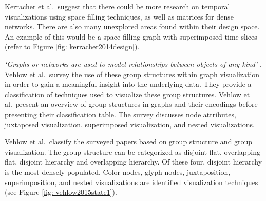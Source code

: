 %
Kerracher et al.\ suggest that there could be more research on temporal visualizations using space filling techniques, as well as matrices for dense networks. There are also many unexplored areas found within their design space. An example of this would be a space-filling graph with superimposed time-slices (refer to Figure \ref{fig: kerracher2014design}).

\textit{`Graphs or networks are used to model relationships between
objects of any kind'} \cite{vehlow2015state}. Vehlow et al.\ survey the use of these group structures within graph visualization in order to gain a meaningful insight into the underlying data. They provide a classification of techniques used to visualize these group structures.
Vehlow et al.\ present an overview of group structures in graphs and their encodings before presenting their classification table. The survey discusses node attributes, juxtaposed visualization, superimposed visualization, and nested visualizations.

Vehlow et al.\ classify the surveyed papers based on group structure and group visualization. The group structure can be categorized as disjoint flat, overlapping flat, disjoint hierarchy and overlapping hierarchy. Of these four, disjoint hierarchy is the most densely populated. Color nodes, glyph nodes, juxtaposition, superimposition, and nested visualizations are identified visualization techniques (see Figure \ref{fig: vehlow2015state1}).

